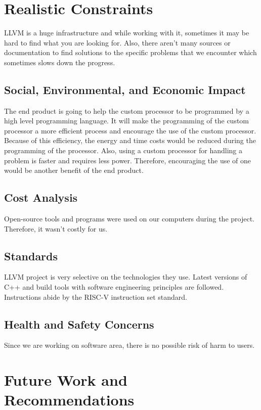 \section{Realistic Constraints}
LLVM is a huge infrastructure and while working with it, sometimes it may be hard to find what you are looking for. Also, there aren’t many sources or documentation to find solutions to the specific problems that we encounter which sometimes slows down the progress.

\subsection{Social, Environmental, and Economic Impact}
The end product is going to help the custom processor to be programmed by a high level programming language. It will make the programming of the custom processor a more efficient process and encourage the use of the custom processor. Because of this efficiency, the energy and time costs would be reduced during the programming of the processor. Also, using a custom processor for handling a problem is faster and requires less power. Therefore, encouraging the use of one would be another benefit of the end product.

\subsection{Cost Analysis}
Open-source tools and programs were used on our computers during the project. Therefore, it wasn’t costly for us.

\subsection{Standards}
LLVM project is very selective on the technologies they use. Latest versions of C++ and build tools with software engineering principles are followed. Instructions abide by the RISC-V instruction set standard.

\subsection{Health and Safety Concerns}
Since we are working on software area, there is no possible risk of harm to users.

\section{Future Work and Recommendations}
